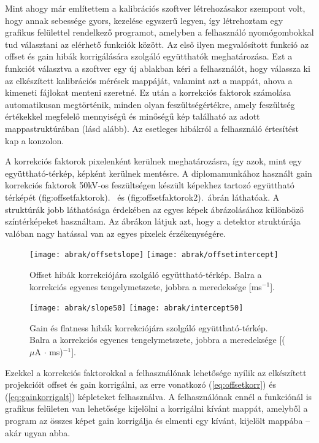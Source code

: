 \documentclass[a4paper,12pt,twoside]{article}
\begin{document}
Mint ahogy már említettem  %
 a kalibrációs szoftver létrehozásakor szempont volt, hogy annak sebessége gyors, kezelése egyszerű legyen, így létrehoztam egy grafikus felülettel rendelkező programot, amelyben a felhasználó nyomógombokkal tud választani az elérhető funkciók között. Az első ilyen megvalósított funkció az offset és gain hibák korrigálására szolgáló együtthatók meghatározása. Ezt a funkciót választva a szoftver egy új ablakban kéri a felhasználót, hogy  válassza ki az elkészített kalibrációs mérések mappáját, valamint azt a mappát, ahova a kimeneti fájlokat menteni szeretné. Ez után a korrekciós faktorok számolása automatikusan megtörténik, minden olyan feszültségértékre, amely feszültség értékekkel megfelelő mennyiségű és minőségű kép található az adott mappastruktúrában (lásd alább). Az esetleges hibákról a felhasználó értesítést kap a konzolon.
 
 
 

A korrekciós faktorok  pixelenként kerülnek meghatározásra, így azok, mint egy együttható-térkép, képként  kerülnek mentésre.
 A diplomamunkához használt gain korrekciós faktorok 50kV-os feszültségen készült képekhez tartozó együttható térképét \aref({fig:offsetfaktorok}).~ és \aref({fig:offsetfaktorok2}).~ábrán láthatóak. A struktúrák jobb láthatósága érdekében az egyes képek ábrázolásához különböző színtérképeket használtam. Az ábrákon látjuk azt, hogy a detektor struktúrája valóban nagy hatással van az egyes pixelek érzékenységére. 
 
 
 \begin{figure}[htbp]
\center
\texttt{[image: abrak/offsetslope]}
\texttt{[image: abrak/offsetintercept]}
\caption{Offset hibák korrekciójára szolgáló együttható-térkép. Balra a korrekciós egyenes tengelymetszete, jobbra a meredeksége [ms$^{-1}$].}
\label{fig:offsetfaktorok}
\end{figure}

 
 
  \begin{figure}[htbp]
\center
\texttt{[image: abrak/slope50]}
\texttt{[image: abrak/intercept50]}
\caption{Gain és flatness hibák korrekciójára szolgáló együttható-térkép. Balra a korrekciós egyenes tengelymetszete, jobbra a meredeksége [($\mu$A $\cdot$ ms)$^{-1}$].}
\label{fig:offsetfaktorok2}
\end{figure}

 
 

 Ezekkel a korrekciós faktorokkal a felhasználónak lehetősége nyílik az elkészített projekcióit offset és gain korrigálni, az erre vonatkozó (\ref{eq:offsetkorr}) és (\ref{eq:gainkorrigalt}) képleteket felhasználva.  A felhasználónak ennél a funkciónál is grafikus felületen van lehetősége kijelölni a korrigálni kívánt mappát, amelyből a program az összes képet gain korrigálja és elmenti egy kívánt, kijelölt mappába -- akár ugyan abba. 
 
\end{document}
